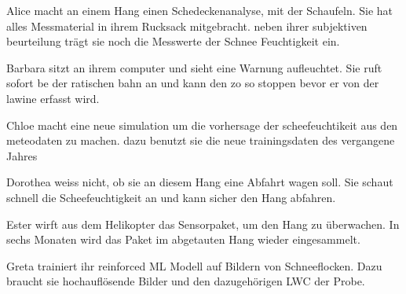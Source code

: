 \label{userstoryvoll}

Alice macht an einem Hang einen Schedeckenanalyse, mit der Schaufeln. Sie hat alles Messmaterial in ihrem Rucksack mitgebracht. neben ihrer subjektiven beurteilung trägt sie noch die Messwerte der Schnee Feuchtigkeit ein.

Barbara sitzt an ihrem computer und sieht eine Warnung aufleuchtet. Sie ruft  sofort be der ratischen bahn an und kann den zo so stoppen bevor er von der lawine erfasst wird.

Chloe macht eine neue simulation um die vorhersage der scheefeuchtikeit aus den meteodaten zu machen. dazu benutzt sie die neue trainingsdaten des vergangene Jahres 

Dorothea weiss nicht, ob sie an diesem Hang eine Abfahrt wagen soll. Sie schaut schnell die Scheefeuchtigkeit an und kann sicher den Hang abfahren.

Ester wirft aus dem Helikopter das Sensorpaket, um den Hang zu überwachen. In sechs Monaten wird das Paket im abgetauten Hang wieder eingesammelt.

Greta trainiert ihr reinforced ML Modell auf Bildern von Schneeflocken. Dazu braucht sie hochauflösende Bilder und den dazugehörigen LWC der Probe.

